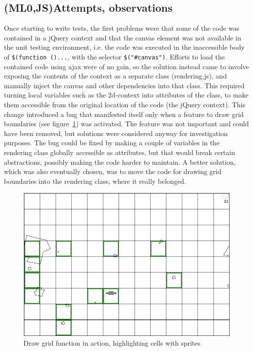\documentclass[11pt]{article}
\begin{document}
\subsection{(ML0,JS)Attempts, observations}

Once starting to write tests, the first problems were that some of the code was contained in a jQuery context and that the canvas element was not available in the unit testing environment, i.e. the code was executed in the inaccessible body of \texttt{\$(function ()...}, with the selector \texttt{\$("\#canvas")}. Efforts to load the contained code using ajax were of no gain, so the solution instead came to involve exposing the contents of the context as a separate class (rendering.js), and manually inject the canvas and other dependencies into that class. This required turning local variables such as the 2d-context into attributes of the class, to make them accessible from the original location of the code (the jQuery context). This change introduced a bug that manifested itself only when a feature to draw grid boundaries (see figure~\ref{fig:game8}) was activated. The feature was not important and could have been removed, but solutions were considered anyway for investigation purposes. The bug could be fixed by making a couple of variables in the rendering class globally accessible as attributes, but that would break certain abstractions, possibly making the code harder to maintain. A better solution, which was also eventually chosen, was to move the code for drawing grid boundaries into the rendering class, where it really belonged.

\begin{figure}[ht!]
\centering
\includegraphics[width=1.0\textwidth]{pics/game8.png}
\caption{Draw grid function in action, highlighting cells with sprites}
\label{fig:game8}
\end{figure}
\end{document}
